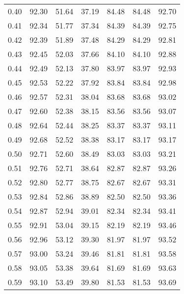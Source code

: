\begin{tabular}{|c|c|c|c|c|c|c|}
      0.40 &     92.30 &     51.64 &      37.19 &   84.48 &      84.48 &         92.70 \\
      0.41 &     92.34 &     51.77 &      37.34 &   84.39 &      84.39 &         92.75 \\
      0.42 &     92.39 &     51.89 &      37.48 &   84.29 &      84.29 &         92.81 \\
      0.43 &     92.45 &     52.03 &      37.66 &   84.10 &      84.10 &         92.88 \\
      0.44 &     92.49 &     52.13 &      37.80 &   83.97 &      83.97 &         92.93 \\
      0.45 &     92.53 &     52.22 &      37.92 &   83.84 &      83.84 &         92.98 \\
      0.46 &     92.57 &     52.31 &      38.04 &   83.68 &      83.68 &         93.02 \\
      0.47 &     92.60 &     52.38 &      38.15 &   83.56 &      83.56 &         93.07 \\
      0.48 &     92.64 &     52.44 &      38.25 &   83.37 &      83.37 &         93.11 \\
      0.49 &     92.68 &     52.52 &      38.38 &   83.17 &      83.17 &         93.17 \\
      0.50 &     92.71 &     52.60 &      38.49 &   83.03 &      83.03 &         93.21 \\
      0.51 &     92.76 &     52.71 &      38.64 &   82.87 &      82.87 &         93.26 \\
      0.52 &     92.80 &     52.77 &      38.75 &   82.67 &      82.67 &         93.31 \\
      0.53 &     92.84 &     52.86 &      38.89 &   82.50 &      82.50 &         93.36 \\
      0.54 &     92.87 &     52.94 &      39.01 &   82.34 &      82.34 &         93.41 \\
      0.55 &     92.91 &     53.04 &      39.15 &   82.19 &      82.19 &         93.46 \\
      0.56 &     92.96 &     53.12 &      39.30 &   81.97 &      81.97 &         93.52 \\
      0.57 &     93.00 &     53.24 &      39.46 &   81.81 &      81.81 &         93.58 \\
      0.58 &     93.05 &     53.38 &      39.64 &   81.69 &      81.69 &         93.63 \\
      0.59 &     93.10 &     53.49 &      39.80 &   81.53 &      81.53 &         93.69 \\

\end{tabular}
